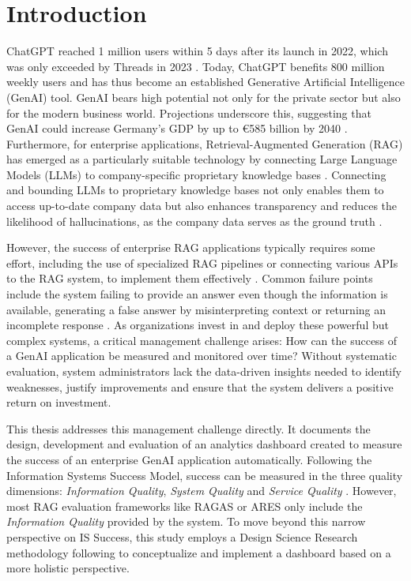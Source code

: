 \documentclass[
	english,
	ruledheaders=section,%
	class=report,%
	thesis={type=bachelor},%
	accentcolor=1b,%
	custommargins=true,%
	marginpar=false,%
	parskip=half-,%
	fontsize=11pt,%
	DIV=14,
]{tudapub}
\begin{document}
\chapter{Introduction}
ChatGPT reached 1 million users within 5 days after its launch in 2022, which was only exceeded by Threads in 2023 \parencite{Brandt2023}. Today, ChatGPT benefits 800 million weekly users \parencite{Huber2025} and has thus become an established Generative Artificial Intelligence (GenAI) tool. GenAI bears high potential not only for the private sector but also for the modern business world. Projections underscore this, suggesting that GenAI could increase Germany's GDP by up to €585 billion by 2040 \parencite[p.~12]{McKinsey2023}. Furthermore, for enterprise applications, Retrieval-Augmented Generation (RAG) has emerged as a particularly suitable technology by connecting Large Language Models (LLMs) to company-specific proprietary knowledge bases  \parencite[p.~9459]{Lewis2020}. Connecting and bounding LLMs to proprietary knowledge bases not only enables them to access up-to-date company data \parencite{GoogleCloudRAG} but also enhances transparency and reduces the likelihood of hallucinations, as the company data serves as the ground truth  \parencite[p.~9469]{Lewis2020}.

However, the success of enterprise RAG applications typically requires some effort, including the use of specialized RAG pipelines or connecting various APIs to the RAG system, to implement them effectively \parencite[pp.~5--7]{Bruckhaus2024RAG}. Common failure points include the system failing to provide an answer even though the information is available, generating a false answer by misinterpreting context or returning an incomplete response \parencite[p.~91]{Barnett2024}. As organizations invest in and deploy these powerful but complex systems, a critical management challenge arises: How can the success of a GenAI application be measured and monitored over time? Without systematic evaluation, system administrators lack the data-driven insights needed to identify weaknesses, justify improvements and ensure that the system delivers a positive return on investment.

This thesis addresses this management challenge directly. It documents the design, development and evaluation of an analytics dashboard created to measure the success of an enterprise GenAI application automatically. Following the Information Systems Success Model, success can be measured in the three quality dimensions: \textit{Information Quality}, \textit{System Quality} and \textit{Service Quality} \parencite[pp.~23--24]{DeloneMcLean2003ISSuccessTenYearUpdate}. However, most RAG evaluation frameworks like RAGAS \parencite{Es2024} or ARES \parencite{Saad-Falcon2024} only include the \textit{Information Quality} provided by the system. To move beyond this narrow perspective on IS Success, this study employs a Design Science Research methodology following \cite{Peffers2007} to conceptualize and implement a dashboard based on a more holistic perspective.
\end{document}
